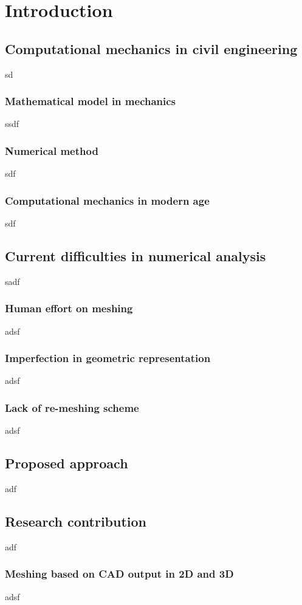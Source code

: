 
\chapter{Introduction}

\section{Computational mechanics in civil engineering}
sd
    \subsection{Mathematical model in mechanics}
    ssdf
    \subsection{Numerical method}
    sdf
    \subsection{Computational mechanics in modern age}
    sdf
\section{Current difficulties in numerical analysis}
sadf
    \subsection{Human effort on meshing}
    adsf
    \subsection{Imperfection in geometric representation}
    adsf
    \subsection{Lack of re-meshing scheme}
    adsf
\section{Proposed approach}
adf
\section{Research contribution}
 adf   
    \subsection{Meshing based on CAD output in 2D and 3D}
    adsf
